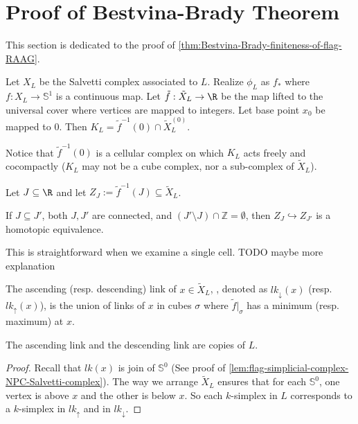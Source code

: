 \section{Proof of Bestvina-Brady Theorem}
\label{sec:morse-theory}

This section is dedicated to the proof of \cref{thm:Bestvina-Brady-finiteness-of-flag-RAAG}. 

\BestvinaBrady*

Let \(X_L\) be the Salvetti complex associated to \(L\).
Realize \(\phi_L\) as \(f_*\) where \(f:X_L \to \mathbb{S}^1\) is a continuous map. Let \(\tilde f:\tilde X_L \to \R\) be the map lifted to the universal cover where vertices are mapped to integers. Let base point \(x_0\) be mapped to \(0\). Then \(K_L = \tilde f ^{-1}(0)\cap \tilde X_L^{(0)}\).

Notice that \(\tilde f^{-1}(0)\) is a cellular complex on which \(K_L\) acts freely and cocompactly (\(K_L\) may not be a cube complex, nor a sub-complex of \(\tilde X_L\)).

Let \(J\subseteq \R\) and let \(Z_J:= \tilde f^{-1}(J) \subseteq \tilde X_L\).

\begin{lemma}
    \label{lem:BB-Zj-expand-homptic-equiv}
    If \(J\subseteq J'\), both \(J, J'\) are connected, and \((J'\setminus J)\cap  \mathbb{Z}  = \emptyset\), then \(Z_J \hookrightarrow Z_{J'}\) is a homotopic equivalence.
\end{lemma}

This is straightforward when we examine a single cell.
TODO maybe more explanation

\begin{definition}
    \label{ascending-descending-link}
    The ascending (resp. descending) link of \(x\in \tilde X_L\), , denoted as \(lk_\downarrow(x) \) (resp. \(lk_\uparrow(x)\)), is the union of links of \(x\) in cubes \(\sigma\) where \(\tilde f |_\sigma\) has a minimum (resp. maximum) at \(x\).
\end{definition}


\begin{lemma}
    \label{ascending-descending-link-is-L}
    The ascending link and the descending link are copies of \(L\).
\end{lemma}
\begin{proof}
    Recall that \(lk(x)\) is join of \(\mathbb{S}^0\) (See proof of \cref{lem:flag-simplicial-complex-NPC-Salvetti-complex}). The way we arrange \(\tilde X_L\) ensures that for each \(\mathbb{S}^0\), one vertex is above \(x\) and the other is below \(x\). So each \(k\)-simplex in \(L\) corresponds to a \(k\)-simplex in \(lk_\uparrow\) and in \(lk_\downarrow\).
\end{proof}


